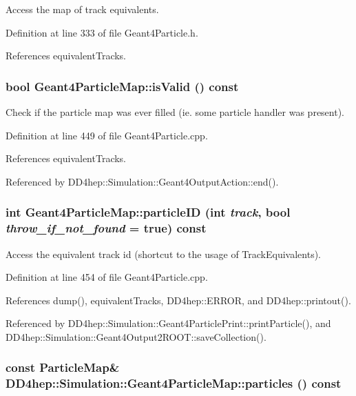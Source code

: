Access the map of track equivalents. 

Definition at line 333 of file Geant4Particle.h.

References equivalentTracks.\hypertarget{class_d_d4hep_1_1_simulation_1_1_geant4_particle_map_a66ca25cafd6b47eb61632c7bfb9c5a36}{
\subsubsection[{isValid}]{\setlength{\rightskip}{0pt plus 5cm}bool Geant4ParticleMap::isValid () const}}
\label{class_d_d4hep_1_1_simulation_1_1_geant4_particle_map_a66ca25cafd6b47eb61632c7bfb9c5a36}


Check if the particle map was ever filled (ie. some particle handler was present). 

Definition at line 449 of file Geant4Particle.cpp.

References equivalentTracks.

Referenced by DD4hep::Simulation::Geant4OutputAction::end().\hypertarget{class_d_d4hep_1_1_simulation_1_1_geant4_particle_map_a9155a0ddccd1e18b880e335dcf75ab2d}{
\subsubsection[{particleID}]{\setlength{\rightskip}{0pt plus 5cm}int Geant4ParticleMap::particleID (int {\em track}, \/  bool {\em throw\_\-if\_\-not\_\-found} = {\ttfamily true}) const}}
\label{class_d_d4hep_1_1_simulation_1_1_geant4_particle_map_a9155a0ddccd1e18b880e335dcf75ab2d}


Access the equivalent track id (shortcut to the usage of TrackEquivalents). 

Definition at line 454 of file Geant4Particle.cpp.

References dump(), equivalentTracks, DD4hep::ERROR, and DD4hep::printout().

Referenced by DD4hep::Simulation::Geant4ParticlePrint::printParticle(), and DD4hep::Simulation::Geant4Output2ROOT::saveCollection().\hypertarget{class_d_d4hep_1_1_simulation_1_1_geant4_particle_map_a3446a55a7dfdaf6d723c6a347249d63a}{
\subsubsection[{particles}]{\setlength{\rightskip}{0pt plus 5cm}const {\bf ParticleMap}\& DD4hep::Simulation::Geant4ParticleMap::particles () const}}
\label{class_d_d4hep_1_1_simulation_1_1_geant4_particle_map_a3446a55a7dfdaf6d723c6a347249d63a}


